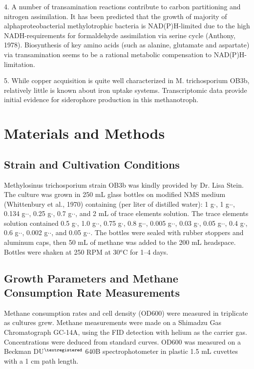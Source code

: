 4. A number of transamination reactions contribute to carbon partitioning and nitrogen assimilation.
It has been predicted that the growth of majority of alphaproteobacterial methylotrophic bacteria is NAD(P)H-limited due to the high NADH-requirements for formaldehyde assimilation via serine cycle (Anthony, 1978).
Biosynthesis of key amino acids (such as alanine, glutamate and aspartate) via transamination seems to be a rational metabolic compensation to NAD(P)H-limitation.

5. While copper acquisition is quite well characterized in M. trichosporium OB3b, relatively little is known about iron uptake systems.
Transcriptomic data provide initial evidence for siderophore production in this methanotroph.

\section{Materials and Methods}
\subsection{Strain and Cultivation Conditions}
Methylosinus trichosporium strain OB3b was kindly provided by Dr. Lisa Stein.
The culture was grown in 250 mL glass bottles on modified NMS medium (Whittenbury et al., 1970) containing (per liter of distilled water): 1 g$\cdot$, 1 g$\cdot$$\cdot$, 0.134 g$\cdot$$\cdot$, 0.25 g$\cdot$, 0.7 g$\cdot$$\cdot$, and 2 mL of trace elements solution.
The trace elements solution contained 0.5 g$\cdot$, 1.0 g$\cdot$$\cdot$, 0.75 g$\cdot$, 0.8 g$\cdot$$\cdot$, 0.005 g$\cdot$$\cdot$, 0.03 g$\cdot$, 0.05 g$\cdot$$\cdot$, 0.4 g$\cdot$, 0.6 g$\cdot$$\cdot$, 0.002 g$\cdot$$\cdot$, and 0.05 g$\cdot$$\cdot$.
The bottles were sealed with rubber stoppers and aluminum caps, then 50 mL of methane was added to the 200 mL headspace.
Bottles were shaken at 250 RPM at 30$^o$C for 1–4 days.

\subsection{Growth Parameters and Methane Consumption Rate Measurements}
Methane consumption rates and cell density (OD600) were measured in triplicate as cultures grew.
Methane measurements were made on a Shimadzu Gas Chromatograph GC-14A, using the FID detection with helium as the carrier gas.
Concentrations were deduced from standard curves.
OD600 was measured on a Beckman DU$^{\textregistered}$ 640B spectrophotometer in plastic 1.5 mL cuvettes with a 1 cm path length.

